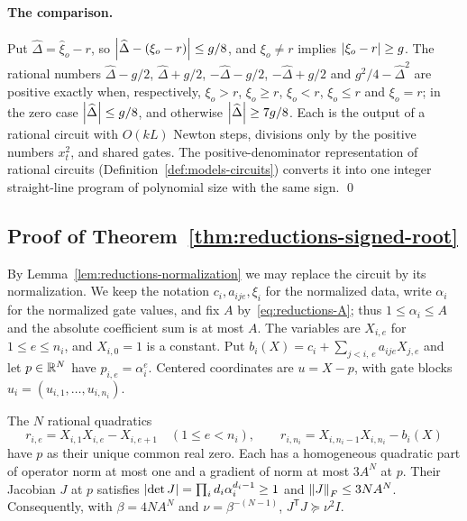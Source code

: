 \paragraph{The comparison.}
Put $\widehat\Delta=\widehat\xi_o-r$, so $\left\lvert\widehat\Delta-(\xi_o-r)\right\rvert\le g/8$,
and $\xi_o\ne r$ implies $\left\lvert\xi_o-r\right\rvert\ge g$. The rational numbers
$\widehat\Delta-g/2$, $\widehat\Delta+g/2$, $-\widehat\Delta-g/2$,
$-\widehat\Delta+g/2$ and $g^2/4-\widehat\Delta^2$ are positive exactly when,
respectively, $\xi_o>r$, $\xi_o\ge r$, $\xi_o<r$, $\xi_o\le r$ and $\xi_o=r$; in
the zero case $\left\lvert\widehat\Delta\right\rvert\le g/8$, and otherwise
$\left\lvert\widehat\Delta\right\rvert\ge7g/8$. Each is the output of a rational circuit with
$O(kL)$ Newton steps, divisions only by the positive numbers $x_t^2$, and shared
gates. The positive-denominator representation of rational circuits
(Definition~\ref{def:models-circuits}) converts it into one integer
straight-line program of polynomial size with the same sign. \qed

\subsection{Proof of Theorem~\ref{thm:reductions-signed-root}}
\label{app:reductions-signed-root}

By Lemma~\ref{lem:reductions-normalization} we may replace the circuit by its
normalization. We keep the notation $c_i,a_{ije},\xi_i$ for the normalized data,
write $\alpha_i$ for the normalized gate values, and fix $A$
by~\eqref{eq:reductions-A}; thus $1\le\alpha_i\le A$ and the absolute
coefficient sum is at most $A$. The variables are $X_{i,e}$ for
$1\le e\le n_i$, and $X_{i,0}=1$ is a constant. Put
$b_i(X)=c_i+\sum_{j<i,\,e}a_{ije}X_{j,e}$ and let $p\in\mathbb R^N$ have
$p_{i,e}=\alpha_i^e$. Centered coordinates are $u=X-p$, with gate blocks
$u_i=(u_{i,1},\ldots,u_{i,n_i})$.

\begin{lemma}[Residuals]
\label{lem:reductions-residuals}
The $N$ rational quadratics
\[
 r_{i,e}=X_{i,1}X_{i,e}-X_{i,e+1}\quad(1\le e<n_i),\qquad
 r_{i,n_i}=X_{i,n_i-1}X_{i,n_i}-b_i(X)
\]
have $p$ as their unique common real zero. Each has a homogeneous quadratic
part of operator norm at most one and a gradient of norm at most $3A^N$ at $p$.
Their Jacobian $J$ at $p$ satisfies $\left\lvert\det J\right\rvert=\prod_id_i\alpha_i^{d_i-1}\ge1$
and $\left\lVert J\right\rVert_F\le3NA^N$. Consequently, with $\beta=4NA^N$ and
$\nu=\beta^{-(N-1)}$, $J^{\mathsf T}J\succeq\nu^2I$.
\end{lemma}

